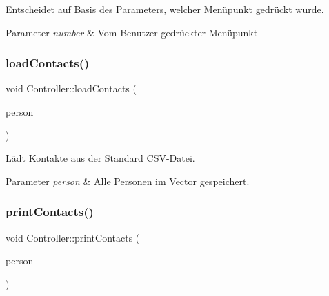 Entscheidet auf Basis des Parameters, welcher Menüpunkt gedrückt wurde.


\begin{DoxyParams}{Parameter}
{\em number} & Vom Benutzer gedrückter Menüpunkt\\
\hline
\end{DoxyParams}
\mbox{\label{classContactManager_1_1Controller_aa10f0286519a294d96077af9eaa7b98c}} 
\subsubsection{\texorpdfstring{load\+Contacts()}{loadContacts()}}
{\footnotesize\ttfamily void Controller\+::load\+Contacts (\begin{DoxyParamCaption}\item[{vector$<$ \hyperlink{classContactManager_1_1Person}{Person} $>$ \&}]{person }\end{DoxyParamCaption})}



Lädt Kontakte aus der Standard C\+S\+V-\/\+Datei.


\begin{DoxyParams}{Parameter}
{\em person} & Alle Personen im Vector gespeichert.\\
\hline
\end{DoxyParams}
\mbox{\label{classContactManager_1_1Controller_abd46b513b9d71e896fa3187e616aa805}} 
\subsubsection{\texorpdfstring{print\+Contacts()}{printContacts()}}
{\footnotesize\ttfamily void Controller\+::print\+Contacts (\begin{DoxyParamCaption}\item[{vector$<$ \hyperlink{classContactManager_1_1Person}{Person} $>$ \&}]{person }\end{DoxyParamCaption})}



